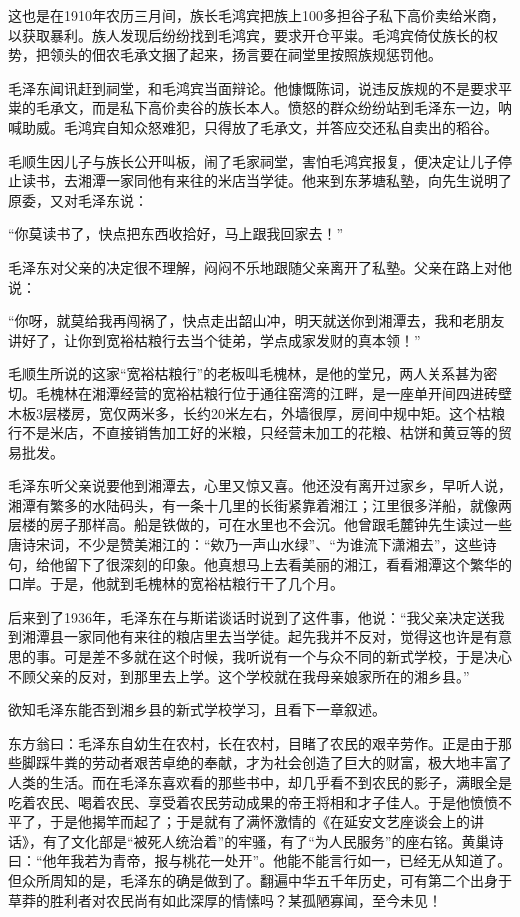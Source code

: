 \documentclass[../../dazhuan.tex]{subfiles}
\begin{document}
这也是在1910年农历三月间，族长毛鸿宾把族上100多担谷子私下高价卖给米商，以获取暴利。族人发现后纷纷找到毛鸿宾，要求开仓平粜。毛鸿宾倚仗族长的权势，把领头的佃农毛承文捆了起来，扬言要在祠堂里按照族规惩罚他。

毛泽东闻讯赶到祠堂，和毛鸿宾当面辩论。他慷慨陈词，说违反族规的不是要求平粜的毛承文，而是私下高价卖谷的族长本人。愤怒的群众纷纷站到毛泽东一边，呐喊助威。毛鸿宾自知众怒难犯，只得放了毛承文，并答应交还私自卖出的稻谷。

毛顺生因儿子与族长公开叫板，闹了毛家祠堂，害怕毛鸿宾报复，便决定让儿子停止读书，去湘潭一家同他有来往的米店当学徒。他来到东茅塘私塾，向先生说明了原委，又对毛泽东说：

“你莫读书了，快点把东西收拾好，马上跟我回家去！”

毛泽东对父亲的决定很不理解，闷闷不乐地跟随父亲离开了私塾。父亲在路上对他说：

“你呀，就莫给我再闯祸了，快点走出韶山冲，明天就送你到湘潭去，我和老朋友讲好了，让你到宽裕枯粮行去当个徒弟，学点成家发财的真本领！”

毛顺生所说的这家“宽裕枯粮行”的老板叫毛槐林，是他的堂兄，两人关系甚为密切。毛槐林在湘潭经营的宽裕枯粮行位于通往窑湾的江畔，是一座单开间四进砖壁木板3层楼房，宽仅两米多，长约20米左右，外墙很厚，房间中规中矩。这个枯粮行不是米店，不直接销售加工好的米粮，只经营未加工的花粮、枯饼和黄豆等的贸易批发。

毛泽东听父亲说要他到湘潭去，心里又惊又喜。他还没有离开过家乡，早听人说，湘潭有繁多的水陆码头，有一条十几里的长街紧靠着湘江；江里很多洋船，就像两层楼的房子那样高。船是铁做的，可在水里也不会沉。他曾跟毛麓钟先生读过一些唐诗宋词，不少是赞美湘江的：“欸乃一声山水绿”、“为谁流下潇湘去”，这些诗句，给他留下了很深刻的印象。他真想马上去看美丽的湘江，看看湘潭这个繁华的口岸。于是，他就到毛槐林的宽裕枯粮行干了几个月。

后来到了1936年，毛泽东在与斯诺谈话时说到了这件事，他说：“我父亲决定送我到湘潭县一家同他有来往的粮店里去当学徒。起先我并不反对，觉得这也许是有意思的事。可是差不多就在这个时候，我听说有一个与众不同的新式学校，于是决心不顾父亲的反对，到那里去上学。这个学校就在我母亲娘家所在的湘乡县。”

欲知毛泽东能否到湘乡县的新式学校学习，且看下一章叙述。

东方翁曰：毛泽东自幼生在农村，长在农村，目睹了农民的艰辛劳作。正是由于那些脚踩牛粪的劳动者艰苦卓绝的奉献，才为社会创造了巨大的财富，极大地丰富了人类的生活。而在毛泽东喜欢看的那些书中，却几乎看不到农民的影子，满眼全是吃着农民、喝着农民、享受着农民劳动成果的帝王将相和才子佳人。于是他愤愤不平了，于是他揭竿而起了；于是就有了满怀激情的《在延安文艺座谈会上的讲话》，有了文化部是“被死人统治着”的牢骚，有了“为人民服务”的座右铭。黄巢诗曰：“他年我若为青帝，报与桃花一处开”。他能不能言行如一，已经无从知道了。但众所周知的是，毛泽东的确是做到了。翻遍中华五千年历史，可有第二个出身于草莽的胜利者对农民尚有如此深厚的情愫吗？某孤陋寡闻，至今未见！
\end{document}

